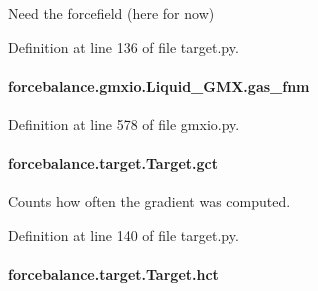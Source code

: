 Need the forcefield (here for now) 



Definition at line 136 of file target.\-py.

\hypertarget{classforcebalance_1_1gmxio_1_1Liquid__GMX_a9a71d05c2c32e27dd94b1f917e20c685}{
\paragraph[{gas\-\_\-fnm}]{\setlength{\rightskip}{0pt plus 5cm}forcebalance.\-gmxio.\-Liquid\-\_\-\-G\-M\-X.\-gas\-\_\-fnm}}\label{classforcebalance_1_1gmxio_1_1Liquid__GMX_a9a71d05c2c32e27dd94b1f917e20c685}


Definition at line 578 of file gmxio.\-py.

\hypertarget{classforcebalance_1_1target_1_1Target_aa625ac88c6744eb14ef281d9496d0dbb}{
\paragraph[{gct}]{\setlength{\rightskip}{0pt plus 5cm}forcebalance.\-target.\-Target.\-gct\hspace{0.3cm}{\ttfamily [inherited]}}}\label{classforcebalance_1_1target_1_1Target_aa625ac88c6744eb14ef281d9496d0dbb}


Counts how often the gradient was computed. 



Definition at line 140 of file target.\-py.

\hypertarget{classforcebalance_1_1target_1_1Target_a5b5a42f78052b47f29ed4b940c6111a1}{
\paragraph[{hct}]{\setlength{\rightskip}{0pt plus 5cm}forcebalance.\-target.\-Target.\-hct\hspace{0.3cm}{\ttfamily [inherited]}}}\label{classforcebalance_1_1target_1_1Target_a5b5a42f78052b47f29ed4b940c6111a1}


